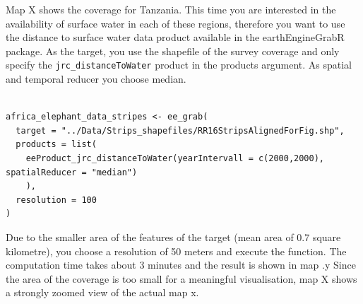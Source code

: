 \documentclass[12pt,twoside,a4paper,final]{report}
\begin{document}
Map X shows the coverage for Tanzania. This time you are interested in the availability of surface water in each of these regions, therefore you want to use the distance to surface water data product available in the earthEngineGrabR package. As the target, you use the shapefile of the survey coverage and only specify the \texttt{jrc\_distanceToWater} product in the products argument. As spatial and temporal reducer you choose median. 

\begin{lstlisting}

africa_elephant_data_stripes <- ee_grab(
  target = "../Data/Strips_shapefiles/RR16StripsAlignedForFig.shp", 
  products = list(
    eeProduct_jrc_distanceToWater(yearIntervall = c(2000,2000), spatialReducer = "median")
    ),
  resolution = 100
)
\end{lstlisting}




Due to the smaller area of the features of the target (mean area of 0.7 square kilometre), you choose a resolution of 50 meters and execute the function. The computation time takes about 3 minutes and the result is shown in map .y Since the area of the coverage is too small for a meaningful visualisation, map X shows a strongly zoomed view of the actual map x. 
\end{document}

